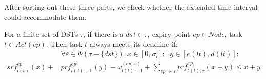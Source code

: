 \documentclass[sigconf]{acmart}
\begin{document}
After sorting out these three parts, we check whether the extended time interval could accommodate them. 




\begin{theorem}\label{theorem_testtask}
  For a finite set of DSTs $\tau$, if there is a $dst\in\tau$, expiry point $ep\in Node$, task $t\in Act(ep)$. Then task $t$ always meets its deadline if:
   \begin{equation}\begin{split}
      &\forall \varepsilon\in\Phi(\tau-\{dst\}),x\in[0,\sigma_l]:\exists y\in[e(lt),d(lt)]:\\
      srf^{ep}_{l(t)}(x)+&prf^{ep}_{l(t),-1}(y)-\omega_{l(t),-1}^{(ep,x)}
      +\sum\limits_{ep_i\in \varepsilon}prf^{ep_i}_{l(t),x}(x+y)\leq x+y.
    \end{split}\label{equation_verification}\end{equation}
\end{theorem}
\end{document}
